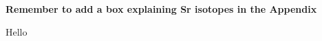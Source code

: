 \documentclass[hidelinks, 11pt]{article} %
\begin{document}


\newpage




\newpage





\newpage





\newpage





\newpage






\newpage




\textbf{Remember to add a box explaining Sr isotopes in the Appendix}

Hello
\end{document}
